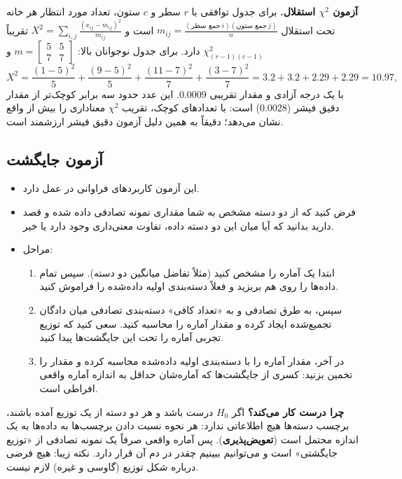 \begin{note}
\notetitle \textbf{آزمون $\chi^2$ استقلال.} برای جدول توافقی با $r$ سطر و $c$ ستون، تعداد مورد انتظار هر خانه تحت استقلال $m_{ij}=\frac{(\text{جمع سطر}\ i)(\text{جمع ستون}\ j)}{n}$ است و $X^2=\sum_{i,j}\frac{(x_{ij}-m_{ij})^2}{m_{ij}}$ تقریباً $\chi^2_{(r-1)(c-1)}$ دارد. برای جدول نوجوانان بالا: $m=\begin{bmatrix}5&5\\7&7\end{bmatrix}$ و
\[
X^2=\frac{(1-5)^2}{5}+\frac{(9-5)^2}{5}+\frac{(11-7)^2}{7}+\frac{(3-7)^2}{7}=3.2+3.2+2.29+2.29=10.97,
\]
با یک درجه آزادی و مقدار  تقریبی $0.0009$. این عدد حدود سه برابر کوچک‌تر از مقدار  دقیق فیشر ($0.0028$) است: با تعدادهای کوچک، تقریب $\chi^2$ معناداری را بیش از واقع نشان می‌دهد؛ دقیقاً به همین دلیل آزمون دقیق فیشر ارزشمند است.
\end{note}

\subsection{آزمون جایگشت }
\begin{itemize}
\item این آزمون کاربردهای فراوانی در عمل دارد.
\item فرض کنید که از دو دسته مشخص به شما مقداری نمونه تصادفی داده شده و قصد دارید بدانید که آیا میان این دو دسته داده، تفاوت معنی‌داری وجود دارد یا خیر.
\item مراحل:
\begin{enumerate}
\item ابتدا یک آماره را مشخص کنید (مثلاً تفاضل میانگین دو دسته). سپس تمام داده‌ها را روی هم بریزید و فعلاً دسته‌بندی اولیه داده‌شده را فراموش کنید.
\item سپس، به طرق تصادفی و به «تعداد کافی» دسته‌بندی تصادفی میان دادگان تجمیع‌شده ایجاد کرده و مقدار آماره را محاسبه کنید. سعی کنید که توزیع تجربی آماره را تحت این جایگشت‌ها پیدا کنید.
\item در آخر، مقدار آماره را با دسته‌بندی اولیه داده‌شده محاسبه کرده و مقدار  را تخمین بزنید: کسری از جایگشت‌ها که آماره‌شان حداقل به اندازه آماره واقعی افراطی است.
\end{enumerate}
\end{itemize}
\textbf{چرا درست کار می‌کند؟} اگر $H_0$ درست باشد و هر دو دسته از یک توزیع آمده باشند، برچسب دسته‌ها هیچ اطلاعاتی ندارد: هر نحوه نسبت دادن برچسب‌ها به داده‌ها به یک اندازه محتمل است (\textbf{تعویض‌پذیری}). پس آماره واقعی صرفاً یک نمونه تصادفی از «توزیع جایگشتی» است و می‌توانیم ببینیم چقدر در دم آن قرار دارد. نکته زیبا: هیچ فرضی درباره شکل توزیع (گاوسی و غیره) لازم نیست.

